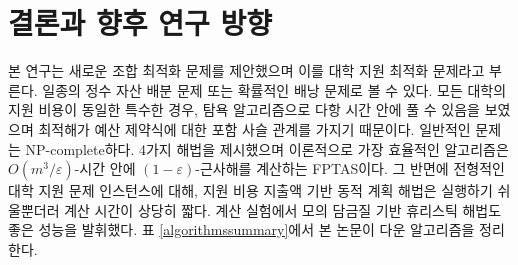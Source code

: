\documentclass[11pt]{article} %
\newif\ifen
\theoremstyle{definition}
\theoremstyle{definition}
\begin{document}
\ifen \section{Conclusion and ideas for future research} \else \section{결론과 향후 연구 방향}\fi\label{conclusion}
\ifen
This study has introduced a novel combinatorial optimization problem that we call the college application problem. It can be viewed as a kind of integer asset allocation problem or nonlinear knapsack problem. We showed that the special case in which colleges have identical application costs can be solved in polynomial time by a greedy algorithm because the optimal solutions are nested in the budget constraint. The general problem is NP-complete. We provided four solution algorithms. The strongest from a theoretical standpoint is an FPTAS that produces a $(1-\varepsilon)$-approximate solution in $O(m^3 / \varepsilon)$-time. On the other hand, for typical college-application instances, the dynamic program based on application expenditures is both easier to implement and substantially more time efficient. A heuristic simulated-annealing algorithm also exhibited strong empirical performance in our computational study. The algorithms discussed in this paper are summarized in Table \ref{algorithmssummary}.
\else
본 연구는 새로운 조합 최적화 문제를 제안했으며 이를 대학 지원 최적화 문제라고 부른다. 일종의 정수 자산 배분 문제 또는 확률적인 배낭 문제로 볼 수 있다. 모든 대학의 지원 비용이 동일한 특수한 경우, 탐욕 알고리즘으로 다항 시간 안에 풀 수 있음을 보였으며 최적해가 예산 제약식에 대한 포함 사슬 관계를 가지기 때문이다. 일반적인 문제는 NP-complete하다. 4가지 해법을 제시했으며 이론적으로 가장 효율적인 알고리즘은 $O(m^3 / \varepsilon)$-시간 안에  $(1-\varepsilon)$-근사해를 계산하는 FPTAS이다. 그 반면에 전형적인 대학 지원 문제 인스턴스에 대해, 지원 비용 지출액 기반 동적 계획 해법은 실행하기 쉬울뿐더러 계산 시간이 상당히 짧다. 계산 실험에서 모의 담금질 기반 휴리스틱 해법도 좋은 성능을 발휘했다. 표 \ref{algorithmssummary}에서 본 논문이 다운 알고리즘을 정리한다.
\fi
\end{document}
